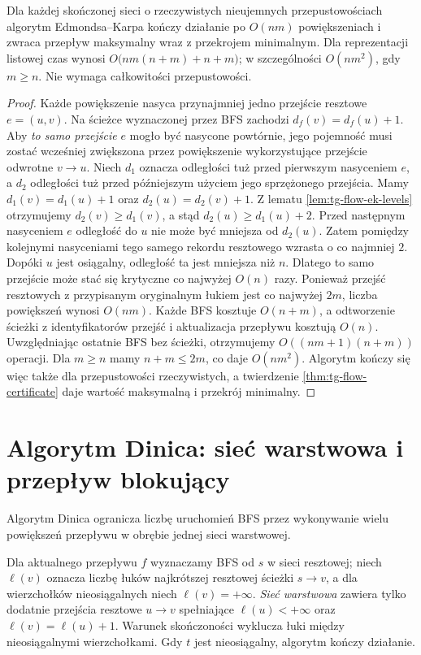 \begin{twierdzenie}
\label{thm:tg-flow-ek}
Dla każdej skończonej sieci o rzeczywistych
nieujemnych przepustowościach algorytm
Edmondsa--Karpa kończy działanie
po $O(nm)$ powiększeniach
i zwraca przepływ maksymalny
wraz z przekrojem minimalnym.
Dla reprezentacji listowej czas wynosi
$O\bigl(nm(n+m)+n+m\bigr)$;
w szczególności $O(nm^2)$,
gdy $m\geq n$.
Nie wymaga całkowitości przepustowości.
\end{twierdzenie}
\begin{proof}
Każde powiększenie nasyca przynajmniej
jedno przejście resztowe $e=(u,v)$.
Na ścieżce wyznaczonej przez BFS
zachodzi $d_f(v)=d_f(u)+1$.
Aby \emph{to samo przejście} $e$
mogło być nasycone powtórnie,
jego pojemność musi zostać
wcześniej zwiększona przez
powiększenie wykorzystujące
przejście odwrotne $v\to u$.
Niech $d_1$ oznacza odległości tuż przed pierwszym
nasyceniem $e$, a $d_2$ odległości tuż przed
późniejszym użyciem jego sprzężonego przejścia.
Mamy $d_1(v)=d_1(u)+1$ oraz $d_2(u)=d_2(v)+1$.
Z lematu \ref{lem:tg-flow-ek-levels} otrzymujemy
$d_2(v)\geq d_1(v)$, a stąd
$d_2(u)\geq d_1(u)+2$.
Przed następnym nasyceniem $e$ odległość do $u$
nie może być mniejsza od $d_2(u)$.
Zatem pomiędzy kolejnymi nasyceniami tego samego
rekordu resztowego wzrasta o co najmniej $2$.
Dopóki $u$ jest osiągalny,
odległość ta jest mniejsza niż $n$.
Dlatego to samo przejście
może stać się krytyczne
co najwyżej $O(n)$ razy.
Ponieważ przejść resztowych
z przypisanym oryginalnym łukiem
jest co najwyżej $2m$,
liczba powiększeń wynosi $O(nm)$.
Każde BFS kosztuje $O(n+m)$, a odtworzenie
ścieżki z identyfikatorów przejść i aktualizacja
przepływu kosztują $O(n)$. Uwzględniając ostatnie
BFS bez ścieżki, otrzymujemy
$O((nm+1)(n+m))$ operacji.
Dla $m\geq n$ mamy $n+m\leq 2m$,
co daje $O(nm^2)$.
Algorytm kończy się więc
także dla przepustowości rzeczywistych,
a twierdzenie \ref{thm:tg-flow-certificate}
daje wartość maksymalną
i przekrój minimalny.
\end{proof}

\section{Algorytm Dinica: sieć warstwowa i przepływ blokujący}
\label{sec:tg-flow-dinic}

Algorytm Dinica ogranicza liczbę uruchomień BFS
przez wykonywanie wielu powiększeń przepływu
w obrębie jednej sieci warstwowej.

\begin{definicja}
\label{def:tg-flow-level}
Dla aktualnego przepływu $f$
wyznaczamy BFS od $s$ w sieci resztowej;
niech $\ell(v)$ oznacza liczbę łuków
najkrótszej resztowej ścieżki $s\to v$,
a dla wierzchołków nieosiągalnych niech
$\ell(v)=+\infty$.
\emph{Sieć warstwowa} zawiera
tylko dodatnie przejścia resztowe
$u\to v$ spełniające
$\ell(u)<+\infty$ oraz $\ell(v)=\ell(u)+1$.
Warunek skończoności wyklucza łuki między
nieosiągalnymi wierzchołkami.
Gdy $t$ jest nieosiągalny, algorytm kończy działanie.
\end{definicja}

